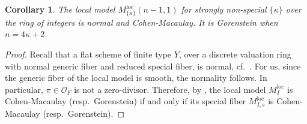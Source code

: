 \documentclass[pdflatex,sn-mathphys-num]{sn-jnl}%
\theoremstyle{thmstyleone}%
\newtheorem{corollary}[subsubsection]{Corollary}%
\theoremstyle{thmstyletwo}%
\numberwithin{equation}{subsection}
\theoremstyle{thmstylethree}%
\newcommand{\CO}{\ensuremath{\mathcal{O}}\xspace}
\newcommand{\loc}{\ensuremath{\mathrm{loc}}\xspace}
\begin{document}
		
\begin{corollary}\label{max_red:normal-cohen-macaulay}
The local model $M^\loc_{\{\kappa\}}(n-1,1)$ for strongly non-special $\{\kappa\}$ over the ring of integers is normal and Cohen-Macaulay. It is Gorenstein when $n=4\kappa+2$. 
\end{corollary}
\begin{proof}
Recall that a flat scheme of finite type $Y$, over a discrete valuation ring with normal generic fiber and reduced special fiber, is normal, cf.\ \cite[Proposition 9.2]{PZ2013}.
For us, since the generic fiber of the local model is smooth, the normality follows. 
In particular, $\pi\in\CO_F$ is not a zero-divisor. Therefore, by \cite[\href{https://stacks.math.columbia.edu/tag/02JN}{02JN},\href{https://stacks.math.columbia.edu/tag/0BJJ}{0BJJ}]{Stacks}, the local model $M_I^\loc$ is Cohen-Macaulay (resp.\ Gorenstein) if and only if its special fiber $M^\loc_{I,s}$ is Cohen-Macaulay (resp.\ Gorenstein).
\end{proof}

		
		
\end{document}
